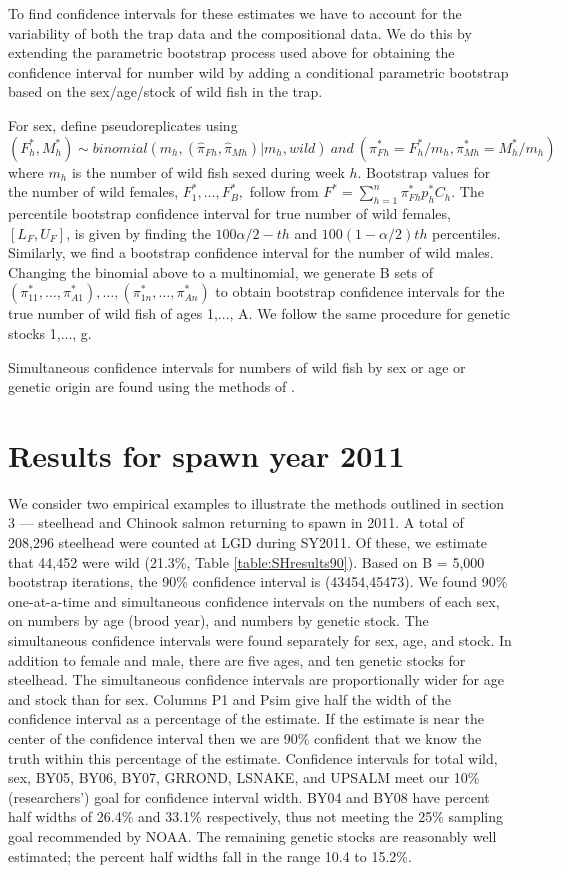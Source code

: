 \documentclass[12pt]{article}
\begin{document}
To find confidence intervals for these estimates we have to account for the variability of both the trap data and the compositional data.  We do this by extending the parametric bootstrap process used above for obtaining the confidence interval for number wild by adding a conditional parametric bootstrap based on the sex/age/stock of wild fish in the trap.

For sex, define pseudoreplicates using
\[(F^*_h,M^*_h) \sim binomial(m_h,(\hat{\pi}_{Fh},\hat{\pi}_{Mh})|m_h, wild) \ and \ (\pi^*_{Fh}=F^*_h/m_h,\pi^*_{Mh}=M^*_h/m_h) \]	  
where \(m_h\)  is the number of wild fish sexed during week $h$.  Bootstrap values for the number of wild females, \(F^*_1,\ldots, F^*_B, \) follow from \(F^*=\sum\limits_{h=1}^{n}\pi^*_{Fh} p^*_{h}C_h \).    The percentile bootstrap confidence interval for true number of wild females, \([L_F,U_F]\), is given by finding the \(100 \alpha/2-th\) and \(100(1-\alpha/2)th\) percentiles.  Similarly, we find a bootstrap confidence interval for the number of wild males.   Changing the binomial above to a multinomial, we generate B sets of \((\pi^*_{11}, \ldots, \pi^*_{A1}), \ldots,(\pi^*_{1n}, \ldots, \pi^*_{An})\) to obtain bootstrap confidence intervals for the true number of wild fish of ages 1,..., A. We follow the same procedure for genetic stocks 1,..., g.

Simultaneous confidence intervals for numbers of wild fish by sex or age or genetic origin are found using the methods of . 

\section{Results for spawn year 2011}
\label{sec:results}

We consider two empirical examples to illustrate the methods outlined in section 3 –-- steelhead and Chinook salmon returning to spawn in 2011. A total of 208,296 steelhead were counted at LGD during SY2011. Of these, we estimate that 44,452 were wild (21.3\%, Table \ref{table:SHresults90}).  Based on B = 5,000 bootstrap iterations, the 90\% confidence interval is (43454,45473). We found 90\% one-at-a-time and simultaneous confidence intervals on the numbers of each sex, on numbers by age (brood year), and numbers by genetic stock. The simultaneous confidence intervals were found separately for sex, age, and stock. In addition to female and male, there are five ages, and ten genetic stocks for steelhead. The simultaneous confidence intervals are proportionally wider for age and stock than for sex. Columns P1 and Psim give half the width of the confidence interval as a percentage of the estimate. If the estimate is near the center of the confidence interval then we are 90\% confident that we know the truth within this percentage of the estimate. Confidence intervals for total wild, sex, BY05, BY06, BY07, GRROND, LSNAKE, and UPSALM meet our 10\% (researchers') goal for confidence interval width. BY04 and BY08 have percent half widths of 26.4\% and 33.1\% respectively, thus not meeting the 25\% sampling goal recommended by NOAA. The remaining genetic stocks are reasonably well estimated; the percent half widths fall in the range 10.4 to 15.2\%.
\end{document}
